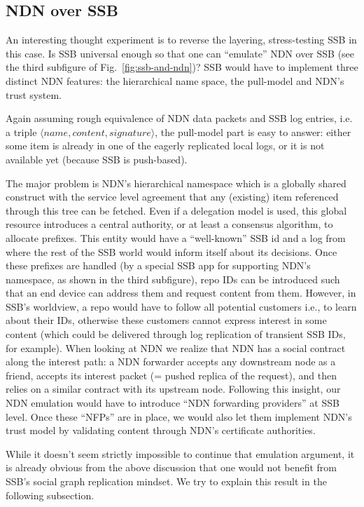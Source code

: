 \documentclass[9pt,sigconf,rewiew]{acmart}
\begin{document}
\subsection{NDN over SSB}
\label{ssect:ndn-over-ssb}

An interesting thought experiment is to reverse the layering,
stress-testing SSB in this case. Is SSB universal enough so that one
can ``emulate'' NDN over SSB (see the third subfigure of
Fig.~\ref{fig:ssb-and-ndn})? SSB would have to implement three
distinct NDN features: the hierarchical name space, the pull-model
and NDN's trust system.

Again assuming rough equivalence of NDN data packets and SSB log
entries, i.e. a triple $\langle name,content,signature\rangle$, the
pull-model part is easy to answer: either some item is already in one
of the eagerly replicated local logs, or it is not available yet
(because SSB is push-based).

The major problem is NDN's hierarchical namespace which is a globally
shared construct with the service level agreement that any (existing)
item referenced through this tree can be fetched.  Even if a
delegation model is used, this global resource introduces a central
authority, or at least a consensus algorithm, to allocate
prefixes. This entity would have a ``well-known'' SSB id and a log
from where the rest of the SSB world would inform itself about its
decisions. Once these prefixes are handled (by a special SSB app for
supporting NDN's namespace, as shown in the third subfigure), repo IDs
can be introduced such that an end device can address them and request
content from them. However, in SSB's worldview, a repo would have to
follow all potential customers i.e., to learn about their IDs,
otherwise these customers cannot express interest in some content
(which could be delivered through log replication of transient SSB
IDs, for example). When looking at NDN we realize that NDN has a
social contract along the interest path: a NDN forwarder accepts any
downstream node as a friend, accepts its interest packet (= pushed
replica of the request), and then relies on a similar contract with
its upstream node. Following this insight, our NDN emulation would
have to introduce ``NDN forwarding providers'' at SSB level. Once
these ``NFPs'' are in place, we would also let them implement
NDN's trust model by validating content through NDN's certificate
authorities.

While it doesn't seem strictly impossible to continue that emulation
argument, it is already obvious from the above discussion that one
would not benefit from SSB's social graph replication mindset. We try
to explain this result in the following subsection.
\end{document}

